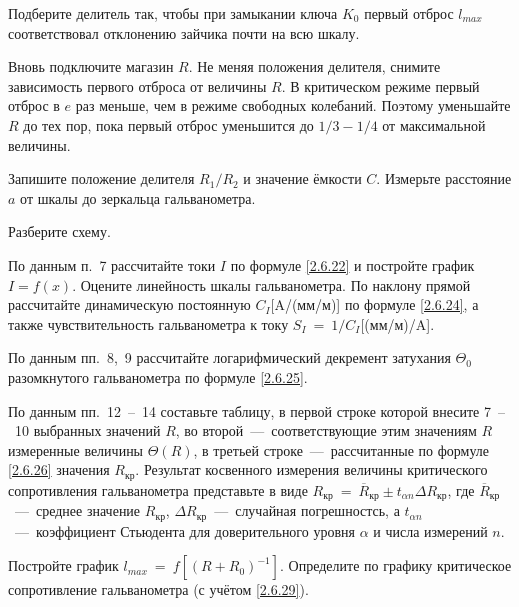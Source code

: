 \begin{lab:task}
Подберите делитель так, чтобы при замыкании ключа
$K_0$ первый отброс $l_{max}$ соответствовал отклонению
зайчика почти на всю шкалу.

	\item Вновь подключите магазин $R$. Не меняя положения делителя,
снимите зависимость первого отброса от величины $R$. В критическом
режиме первый отброс в $e$ раз меньше, чем в режиме свободных
колебаний. Поэтому уменьшайте $R$ до тех пор, пока первый отброс
уменьшится до $1/3-1/4$ от максимальной величины.

	\item Запишите положение делителя
$R_1/R_2$ и значение ёмкости
$C$. Измерьте расстояние $a$ от шкалы до зеркальца
гальванометра.

	\item Разберите схему.


	\item По данным п.~7 рассчитайте токи $I$ по формуле \eqref{2.6.22} и постройте
график $I=f(x)$. Оцените линейность шкалы гальванометра. По наклону
прямой рассчитайте динамическую постоянную $C_I$[A/(мм/м)] по формуле
\eqref{2.6.24}, а также чувствительность гальванометра к току $S_I~=~1/C_I$[(мм/м)/A].

	\item По данным пп.~8,~9 рассчитайте логарифмический декремент затухания $\Theta_0$
разомкнутого гальванометра по формуле \eqref{2.6.25}.

	\item По данным пп.~12~--~14 составьте таблицу, в первой строке которой
внесите 7~--~10 выбранных значений $R$, во второй~---~соответствующие
этим значениям $R$ измеренные величины $\Theta(R)$, в третьей строке~---~рассчитанные по формуле \eqref{2.6.26} значения $R_{\text{кр}}$. Результат косвенного измерения
величины критического сопротивления гальванометра представьте в виде $R_{\text{кр}}~=~\overline R_{\text{кр}}\pm t_{\alpha n}\Delta R_{\text{кр}}$,
где $\overline R_{\text{кр}}$~---~среднее значение $R_{\text{кр}}$, $\Delta R_{\text{кр}}$~---~случайная погрешностсь, а $t_{\alpha n}$~---~коэффициент
Стьюдента для доверительного уровня $\alpha$ и числа измерений $n$.

	\item Постройте график $l_{max}~=~f \left [(R + R_0)^{-1} \right]$. Определите по графику критическое сопротивление
гальванометра (с учётом \eqref{2.6.29}).


\end{lab:task}
